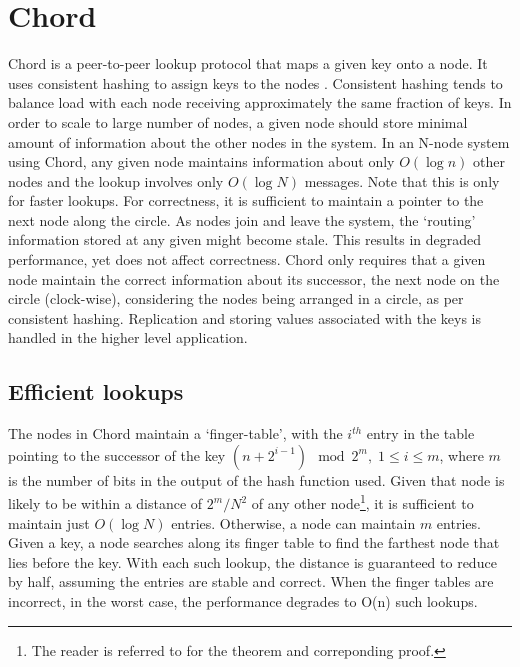 \documentclass{sig-alternate-10pt}
\begin{document}
\section{Chord} 
Chord is a peer-to-peer lookup protocol that maps a given key onto a node. It uses consistent hashing \cite{consistent-hashing} to assign keys to the nodes \cite{chord}. Consistent hashing tends to balance load with each node receiving approximately the same fraction of keys. In order to scale to large number of nodes, a given node should store minimal amount of information about the other nodes in the system. In an N-node system using Chord, any given node maintains information about only $O(\log n)$ other nodes and the lookup involves only $O(\log N)$ messages. Note that this is only for faster lookups. For correctness, it is sufficient to maintain a pointer to the next node along the circle.
As nodes join and leave the system, the `routing' information stored at any given might become stale. This results in degraded performance, yet does not affect correctness. Chord only requires that a given node maintain the correct information about its successor, the next node on the circle (clock-wise), considering the nodes being arranged in a circle, as per consistent hashing. Replication and storing values associated with the keys is handled in the higher level application.
\subsection{Efficient lookups}
The nodes in Chord maintain a `finger-table', with the $i^{th}$ entry in the table pointing to the successor of the key $(n + 2^{i - 1}) \mod 2^m, \; 1 \leq i \leq m$, where $m$ is the number of bits in the output of the hash function used. Given that node is likely to be within a distance of $2^m/N^2$ of any other node\footnote{The reader is referred to \cite{chord} for the theorem and correponding proof.}, it is sufficient to maintain just $O (\log N)$ entries. Otherwise, a node can maintain $m$ entries. Given a key, a node searches along its finger table to find the farthest node that lies before the key. With each such lookup, the distance is guaranteed to reduce by half, assuming the entries are stable and correct. When the finger tables are incorrect, in the worst case, the performance degrades to O(n) such lookups.
\end{document}
